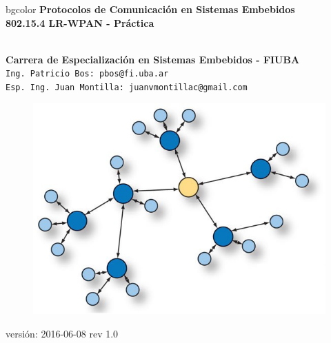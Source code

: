 \documentclass[aspectratio=169,handout]{beamer}
\begin{document}
\begingroup
\makeatletter
\setlength{\hoffset}{-.5\beamer@sidebarwidth}
\makeatother
\begin{frame}
\begin{center}
\hfill
    \begin{beamercolorbox}[center,dp=3ex,ht=10.25ex, wd=1\linewidth]{bgcolor}
        \Large\textbf{Protocolos de Comunicación en Sistemas Embebidos}\\
        \huge\textbf{802.15.4 LR-WPAN - Práctica}
    \end{beamercolorbox}
\hfill\hfill
\\
\vspace{5px}
\textbf{Carrera de Especialización en Sistemas Embebidos - FIUBA}\\
\vspace{10px}
\texttt{Ing. Patricio Bos: pbos@fi.uba.ar}\\
\texttt{Esp. Ing. Juan Montilla: juanvmontillac@gmail.com}\\

\vspace{10px}

\begin{figure}[H]
	\includegraphics[width=.3\textwidth]{./imagenes/red.jpg}
\end{figure}	

\vspace{5px}
\tiny versión: 2016-06-08 rev 1.0 
 	  	
\end{center}
\end{frame}
\endgroup
\end{document}
